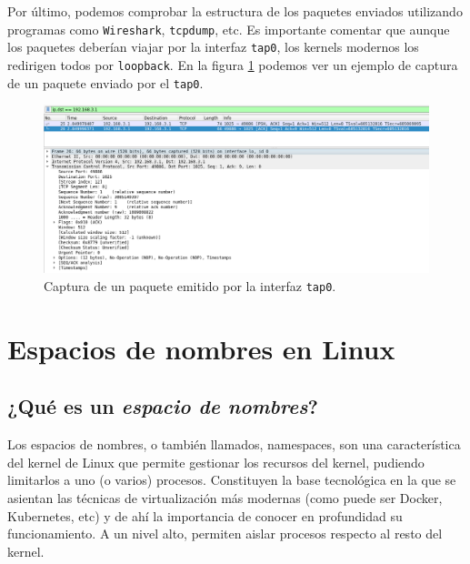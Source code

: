 \documentclass[a4paper, oneside, 12pt]{book}
\begin{document}
	\pagebreak
	
	\noindent Por último, podemos comprobar la estructura de los paquetes enviados utilizando programas como \texttt{Wireshark}, \texttt{tcpdump}, etc. Es importante comentar que aunque los paquetes deberían viajar por la interfaz \texttt{tap0}, los kernels modernos los redirigen todos por \texttt{loopback}. En la figura \ref{img: wireshark tuntap} podemos ver un ejemplo de captura de un paquete enviado por el \texttt{tap0}.
	
	\begin{figure}[h!]
		\begin{center}
			\includegraphics[width=1\textwidth]{img/wireshark_tuntap.png}
			\caption{Captura de un paquete emitido por la interfaz \texttt{tap0}.}
			\label{img: wireshark tuntap}
		\end{center}
	\end{figure}
	
	
	\pagebreak
	
	\chapter{Espacios de nombres en Linux}
	\label{sect: espacio nombres}
	
	\section{¿Qué es un \textit{espacio de nombres}?}
	\noindent Los espacios de nombres, o también llamados, namespaces, son una característica del kernel de Linux que permite gestionar los recursos del kernel, pudiendo limitarlos a uno (o varios) procesos. Constituyen la base tecnológica en la que se asientan las técnicas de virtualización más modernas (como puede ser Docker, Kubernetes, etc) y de ahí la importancia de conocer en profundidad su funcionamiento. A un nivel alto, permiten aislar procesos respecto al resto del kernel. \\
	
\end{document}
